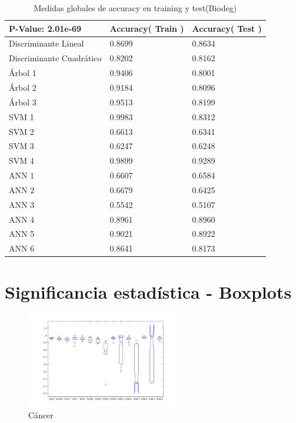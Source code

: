 \documentclass[a4paper,openwrite,12pt]{article}
\begin{document}
\begin{table}[H]
\centering
\begin{tabular}{@{}lll@{}}
\toprule
P-Value: 2.01e-69        & Accuracy( Train ) & Accuracy( Test ) \\ \midrule
Discriminante Lineal     & 0.8699            & 0.8634           \\
Discriminante Cuadrático & 0.8202            & 0.8162           \\
Árbol 1                  & 0.9406            & 0.8001           \\
Árbol 2                  & 0.9184            & 0.8096           \\
Árbol 3                  & 0.9513            & 0.8199           \\
SVM 1                    & 0.9983            & 0.8312           \\
SVM 2                    & 0.6613            & 0.6341           \\
SVM 3                    & 0.6247            & 0.6248           \\
SVM 4                    & 0.9899            & 0.9289           \\
ANN 1                    & 0.6607            & 0.6584           \\
ANN 2                    & 0.6679            & 0.6425           \\
ANN 3                    & 0.5542            & 0.5107           \\
ANN 4                    & 0.8961            & 0.8960           \\
ANN 5                    & 0.9021            & 0.8922           \\
ANN 6                    & 0.8641            & 0.8173           
\end{tabular}
\caption{Medidas globales de accuracy en training y test(Biodeg)}
\label{tab:global_biodeg}
\end{table}

\newpage
\section{Significancia estadística - Boxplots}

\begin{figure}[H]
\centering
\includegraphics[width=0.6\textwidth]{img/box_cancer.bmp.png}
\caption{Cáncer}
\end{figure}
\end{document}
